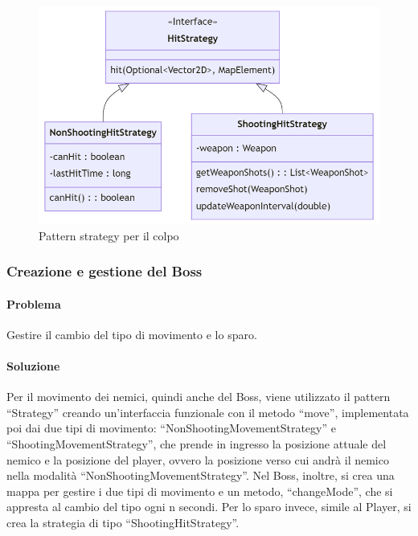 \documentclass[a4paper,12pt]{report}
\begin{document}
\begin{figure}
\centering{}
\includegraphics[scale=0.5]{diagram/hitStrategy.png}
\caption{Pattern strategy per il colpo}
\label{player}
\end{figure}

\newpage
\subsubsection{Creazione e gestione del Boss}
\paragraph{Problema}
Gestire il cambio del tipo di movimento e lo sparo.
\paragraph{Soluzione}
Per il movimento dei nemici, quindi anche del Boss, viene utilizzato il pattern “Strategy” creando un’interfaccia funzionale con il metodo “move”, implementata poi dai due tipi di movimento: “NonShootingMovementStrategy” e “ShootingMovementStrategy”, che prende in ingresso la posizione attuale del nemico e la posizione del player, ovvero la posizione verso cui andrà il nemico nella modalità “NonShootingMovementStrategy”. Nel Boss, inoltre, si crea una mappa per gestire i due tipi di movimento e un metodo, “changeMode”, che si appresta al cambio del tipo ogni n secondi. Per lo sparo invece, simile al Player, si crea la strategia di tipo “ShootingHitStrategy”.
\end{document}
